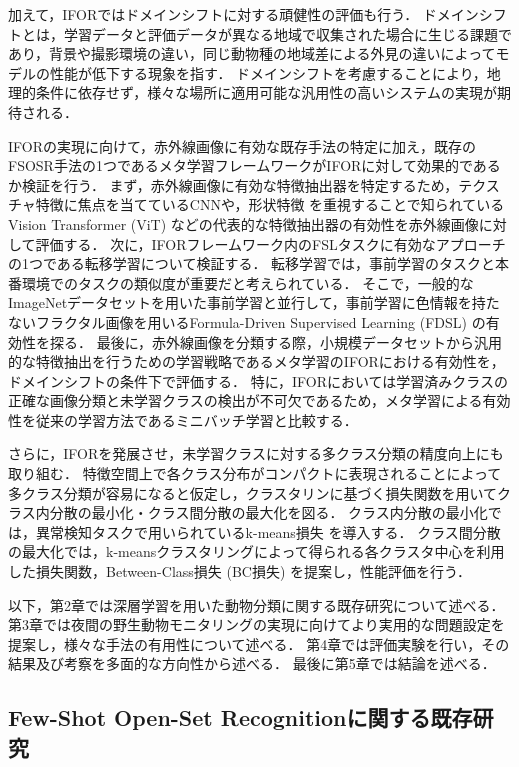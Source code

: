 \documentclass[a4paper,11pt,nomag]{jsreport}
\begin{document}
加えて，IFORではドメインシフトに対する頑健性の評価も行う．
ドメインシフトとは，学習データと評価データが異なる地域で収集された場合に生じる課題であり，背景や撮影環境の違い，同じ動物種の地域差による外見の違いによってモデルの性能が低下する現象を指す．
ドメインシフトを考慮することにより，地理的条件に依存せず，様々な場所に適用可能な汎用性の高いシステムの実現が期待される．

IFORの実現に向けて，赤外線画像に有効な既存手法の特定に加え，既存のFSOSR手法の1つであるメタ学習フレームワークがIFORに対して効果的であるか検証を行う．
まず，赤外線画像に有効な特徴抽出器を特定するため，テクスチャ特徴に焦点を当てているCNNや，形状特徴 \cite{feature}を重視することで知られている Vision Transformer (ViT) \cite{vit}などの代表的な特徴抽出器の有効性を赤外線画像に対して評価する．
次に，IFORフレームワーク内のFSLタスクに有効なアプローチの1つである転移学習について検証する．
転移学習では，事前学習のタスクと本番環境でのタスクの類似度が重要だと考えられている．
そこで，一般的なImageNetデータセットを用いた事前学習と並行して，事前学習に色情報を持たないフラクタル画像を用いるFormula-Driven Supervised Learning (FDSL) \cite{fdsl}の有効性を探る．
最後に，赤外線画像を分類する際，小規模データセットから汎用的な特徴抽出を行うための学習戦略であるメタ学習のIFORにおける有効性を，ドメインシフトの条件下で評価する．
特に，IFORにおいては学習済みクラスの正確な画像分類と未学習クラスの検出が不可欠であるため，メタ学習による有効性を従来の学習方法であるミニバッチ学習と比較する．

さらに，IFORを発展させ，未学習クラスに対する多クラス分類の精度向上にも取り組む．
特徴空間上で各クラス分布がコンパクトに表現されることによって多クラス分類が容易になると仮定し，クラスタリンに基づく損失関数を用いてクラス内分散の最小化・クラス間分散の最大化を図る．
クラス内分散の最小化では，異常検知タスクで用いられているk-means損失 \cite{k-means} を導入する．
クラス間分散の最大化では，k-meansクラスタリングによって得られる各クラスタ中心を利用した損失関数，Between-Class損失 (BC損失) を提案し，性能評価を行う．

以下，第2章では深層学習を用いた動物分類に関する既存研究について述べる．
第3章では夜間の野生動物モニタリングの実現に向けてより実用的な問題設定を提案し，様々な手法の有用性について述べる．
第4章では評価実験を行い，その結果及び考察を多面的な方向性から述べる．
最後に第5章では結論を述べる．

\subsection{Few-Shot Open-Set Recognitionに関する既存研究}





\end{document}
